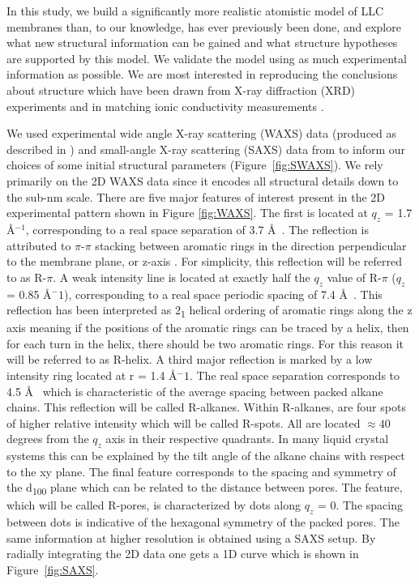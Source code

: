 \documentclass{article}
\newcommand{\angstrom}{\textup{\AA}}
\begin{document}
  In this study, we build a significantly more realistic atomistic model of LLC
  membranes than, to our knowledge, has ever previously been done, and explore
  what new structural information can be gained and what structure hypotheses are
  supported by this model. We validate the model using as much experimental
  information as possible. We are most interested in reproducing the conclusions
  about structure which have been drawn from X-ray diffraction (XRD) experiments
  and in matching ionic conductivity measurements \cite{feng_thin_2016}.

  We used experimental wide angle X-ray scattering (WAXS) data (produced as 
  described in \cite{feng_scalable_2014}) and small-angle X-ray scattering (SAXS)
  data from \cite{feng_thin_2016} to inform our choices of some initial
  structural parameters (Figure~\ref{fig:SWAXS}). We rely primarily on the 2D
  WAXS data since it encodes all structural details down to the sub-nm scale.
  There are five major features of interest present in the 2D experimental
  pattern shown in Figure \ref{fig:WAXS}. The first is located at $q_z$ = 1.7
  \angstrom$^{-1}$, corresponding to a real space separation of 3.7 \angstrom~.
  The reflection is attributed to $\pi$-$\pi$ stacking between aromatic rings in
  the direction perpendicular to the membrane plane, or z-axis
  \cite{feng_scalable_2014}. For simplicity, this reflection will be referred to
  as R-$\pi$. A weak intensity line is located at exactly half the $q_z$ value of
  R-$\pi$ ($q_z$ = 0.85 \angstrom$^-1$), corresponding to a real space periodic
  spacing of 7.4 \angstrom~. This reflection has been interpreted as
  2\textsubscript{1} helical ordering of aromatic rings along the z axis meaning
  if the positions of the aromatic rings can be traced by a helix, then for each
  turn in the helix, there should be two aromatic rings. For this reason it will
  be referred to as R-helix. A third major reflection is marked by a low
  intensity ring located at r = 1.4 \angstrom$^-1$. The real space separation
  corresponds to 4.5 \angstrom~ which is characteristic of the average spacing
  between packed alkane chains. This reflection will be called R-alkanes. Within
  R-alkanes, are four spots of higher relative intensity which will be called
  R-spots. All are located $\approx 40$ degrees from the $q_z$ axis in their
  respective quadrants. In many liquid crystal systems this can be explained by
  the tilt angle of the alkane chains with respect to the xy plane.  The final
  feature corresponds to the spacing and symmetry of the d\textsubscript{100}
  plane which can be related to the distance between pores.  The feature, which
  will be called R-pores, is characterized by dots along $q_z$ = 0. The spacing
  between dots is indicative of the hexagonal symmetry of the packed pores. The
  same information at higher resolution is obtained using a SAXS setup. By
  radially integrating the 2D data one gets a 1D curve which is shown in
  Figure~\ref{fig:SAXS}.
\end{document}
